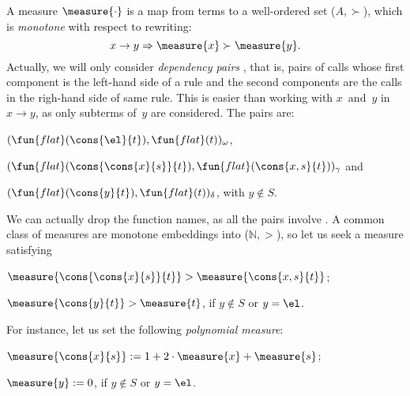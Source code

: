 A measure \(\measure{\cdot}\) is a map from terms to a
well\hyp{}ordered set (\(A,\succ\)), which is \emph{monotone} with
respect to rewriting:
\begin{equation*}
  x \rightarrow y \Rightarrow \measure{x} \succ \measure{y}.
\end{equation*}
Actually, we will only consider \emph{dependency pairs}
\citep{ArtsGiesl_2000}, that is,
pairs of calls whose first component is the left\hyp{}hand side of a
rule and the second components are the calls in the righ\hyp{}hand
side of same rule. This is easier than working with \(x\)~and~\(y\) in
\(x \rightarrow y\), as only subterms of~\(y\) are considered. The
pairs are:
\begin{itemize*}

  \item \((\fun{flat}(\cons{\el}{t}),
    \fun{flat}(t))_\omega\),

  \item \((\fun{flat}(\cons{\cons{x}{s}}{t}),
    \fun{flat}(\cons{x,s}{t}))_\gamma\) and

  \item \((\fun{flat}(\cons{y}{t}), \fun{flat}(t))_\delta\), with \(y
    \not\in S\).
\end{itemize*}
We can actually drop the function names, as all the pairs involve
. A common class of measures are
monotone embeddings into (\(\mathbb{N},>\)), so let us seek a measure
satisfying
\begin{itemize*}

  \item \(\measure{\cons{\cons{x}{s}}{t}} > \measure{\cons{x,s}{t}}\);

  \item \(\measure{\cons{y}{t}} > \measure{t}\), if \(y \not\in S\) or
    \(y=\el\).

\end{itemize*}
For instance, let us set the following \emph{polynomial
  measure}:
\begin{itemize*}

  \item \(\measure{\cons{x}{s}} := 1 + 2\cdot\measure{x} +
    \measure{s}\);

  \item \(\measure{y} := 0\), if \(y \not\in S\) or \(y=\el\).

\end{itemize*}
